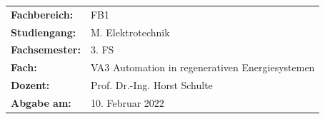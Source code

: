 \documentclass[
	pagesize,
	fontsize=12pt,
	paper=a4,
	oneside,
   reqno
]{scrartcl}
\numberwithin{equation}{section} %
\numberwithin{table}{section} %
\numberwithin{figure}{section} %
\begin{document}
\begin{titlepage}
   \vspace{1cm}

   \begin{tabular}{l l}
      \textbf{Fachbereich:}   & FB1                                                 \\
      \textbf{Studiengang:}   & M.\xspace Elektrotechnik                            \\
      \textbf{Fachsemester:}  & 3.\xspace FS                                        \\
      \textbf{Fach:}          & VA3 Automation in regenerativen Energiesystemen     \\
      \textbf{Dozent:}        & Prof.\xspace Dr.\xspace -Ing.\xspace Horst Schulte  \\
      \textbf{Abgabe am:}     & 10.\xspace Februar 2022                             \\ 
   \end{tabular}
\end{titlepage}
\clearpage

\renewcommand{\contentsname}{Inhaltsverzeichnis}
\tableofcontents
\clearpage

\renewcommand{\listfigurename}{Abbildungsverzeichnis}
\renewcommand*{\figurename}{Abb.}
\listoffigures

\renewcommand*{\listtablename}{Tabellenverzeichnis}
\renewcommand*{\tablename}{Tab.}
\listoftables

\end{document}
